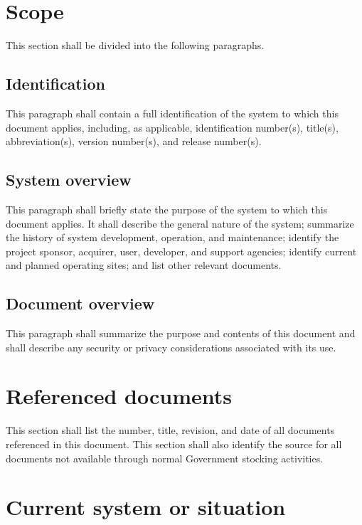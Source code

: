\section{Scope}

This section shall be divided into the following paragraphs.

\subsection{Identification}

This paragraph shall contain a full identification of the system to
which this document applies, including, as applicable, identification
number(s), title(s), abbreviation(s), version number(s), and release
number(s).

\subsection{System overview}

This paragraph shall briefly state the purpose of the system to which
this document applies. It shall describe the general nature of the
system; summarize the history of system development, operation, and
maintenance; identify the project sponsor, acquirer, user, developer,
and support agencies; identify current and planned operating sites; and
list other relevant documents.

\subsection{Document overview}

This paragraph shall summarize the purpose and contents of this document
and shall describe any security or privacy considerations associated
with its use.

\section{Referenced documents}

This section shall list the number, title, revision, and date of all
documents referenced in this document. This section shall also identify
the source for all documents not available through normal Government
stocking activities.

\section{Current system or situation}

